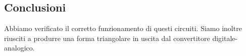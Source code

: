\subsection*{Conclusioni}

Abbiamo verificato il corretto funzionamento di questi circuiti. Siamo inoltre riusciti a produrre una forma triangolare in uscita dal convertitore digitale-analogico.